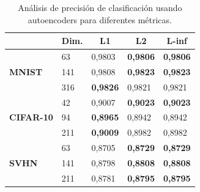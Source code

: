 \begin{table}[!h]
\centering
\caption{Análisis de precisión de clasificación usando autoencoders para diferentes métricas.}
\label{accuracy-similarities-ae}
\begin{tabular}{|l|l|l|l|l|}
\hline
                                   & \multicolumn{1}{c|}{\textbf{Dim.}} & \multicolumn{1}{c|}{\textbf{L1}} & \multicolumn{1}{c|}{\textbf{L2}} & \multicolumn{1}{c|}{\textbf{L-inf}} \\ \hline
\multirow{3}{*}{\textbf{MNIST}}    & 63                                 & 0,9803                           & \textbf{0,9806}                & \textbf{0,9806}                              \\ \cline{2-5} 
                                   & 141                                & 0,9808                           & \textbf{0,9823}                           & \textbf{0,9823}                              \\ \cline{2-5} 
                                   & 316                                & \textbf{0,9826}                           & 0,9821                           & 0,9821                              \\ \hline
\multirow{3}{*}{\textbf{CIFAR-10}} & 42                                 & 0,9007                           & \textbf{0,9023}                           & \textbf{0,9023}                              \\ \cline{2-5} 
                                   & 94                                 & \textbf{0,8965}                           & 0,8942                           & 0,8942                              \\ \cline{2-5} 
                                   & 211                                & \textbf{0,9009}                           & 0,8982                           & 0,8982                              \\ \hline
\multirow{3}{*}{\textbf{SVHN}}     & 63                                 & 0,8705                           & \textbf{0,8729}                           & \textbf{0,8729}                              \\ \cline{2-5} 
                                   & 141                                & 0,8798                           & \textbf{0,8808}                           & \textbf{0,8808}                              \\ \cline{2-5} 
                                   & 211                                & 0,8781                           & \textbf{0,8795}                           & \textbf{0,8795}                              \\ \hline

\end{tabular}
\end{table}
